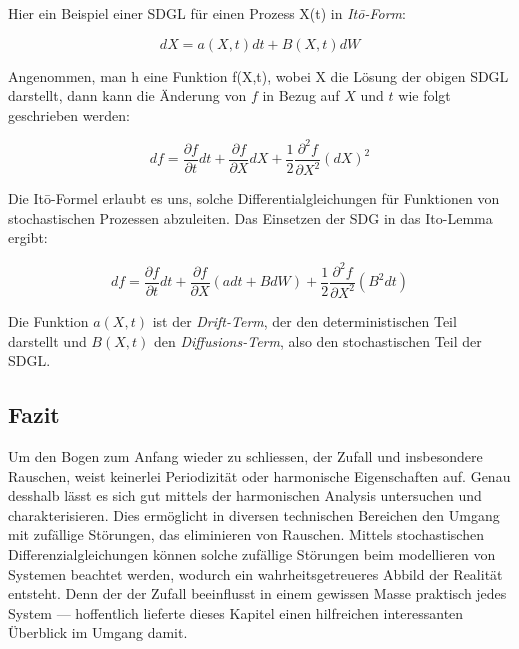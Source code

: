 Hier ein Beispiel einer SDGL für einen Prozess X(t) in \textit{Itō-Form}:

\begin{equation}
	dX = a(X,t) dt + B(X,t) dW
\end{equation}

Angenommen, man h eine Funktion f(X,t), wobei X die Lösung der obigen SDGL darstellt, dann kann die Änderung von $ f $ in Bezug auf $ X $ und $ t $ wie folgt geschrieben werden:

\begin{equation}
	df = \frac{\partial f}{\partial t} dt + \frac{\partial f}{\partial X} dX + \frac{1}{2} \frac{\partial^2 f}{\partial X^2} (dX)^2	
\end{equation}

Die Itō-Formel erlaubt es uns, solche Differentialgleichungen für Funktionen von stochastischen Prozessen abzuleiten. Das Einsetzen der SDG in das Ito-Lemma ergibt:

\begin{equation}
	df = \frac{\partial f}{\partial t} dt + \frac{\partial f}{\partial X} (a dt + B dW) + \frac{1}{2} \frac{\partial^2 f}{\partial X^2} (B^2 dt)
\end{equation}

Die Funktion $ a(X,t) $ ist der \textit{Drift-Term}, der den deterministischen Teil darstellt und $ B(X,t) $ den \textit{Diffusions-Term}, also den stochastischen Teil der SDGL.

\subsection{Fazit\label{brown:fazit}}

Um den Bogen zum Anfang wieder zu schliessen, der Zufall und insbesondere Rauschen, weist keinerlei Periodizität oder harmonische Eigenschaften auf. Genau desshalb lässt es sich gut mittels der harmonischen Analysis untersuchen und charakterisieren. Dies ermöglicht in diversen technischen Bereichen den Umgang mit zufällige Störungen, das eliminieren von Rauschen. 
Mittels stochastischen Differenzialgleichungen können solche zufällige Störungen beim modellieren von Systemen beachtet werden, wodurch ein wahrheitsgetreueres Abbild der Realität entsteht. Denn der der Zufall beeinflusst in einem gewissen Masse praktisch jedes System --- hoffentlich lieferte dieses Kapitel einen hilfreichen interessanten Überblick im Umgang damit.
